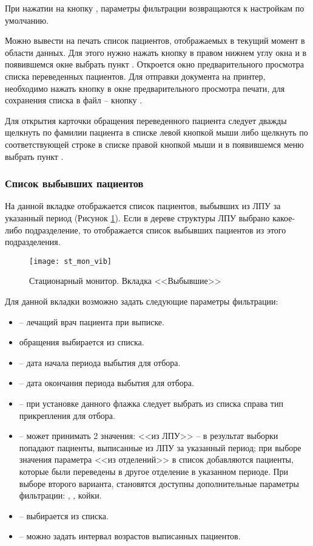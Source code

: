 При нажатии на кнопку , параметры фильтрации возвращаются к настройкам по умолчанию.

Можно вывести на печать список пациентов, отображаемых в текущий момент в области данных. Для этого нужно нажать кнопку   в правом нижнем углу окна и в появившемся окне выбрать пункт . Откроется окно предварительного просмотра списка переведенных пациентов. Для отправки документа на принтер, необходимо нажать кнопку   в окне предварительного просмотра печати, для сохранения списка в файл – кнопку .

Для открытия карточки обращения переведенного пациента следует дважды щелкнуть по фамилии пациента в списке левой кнопкой мыши либо щелкнуть по соответствующей строке в списке правой кнопкой мыши и в появившемся меню выбрать пункт .

\subsubsection{Список выбывших пациентов}

На данной вкладке отображается список пациентов, выбывших из ЛПУ за указанный период (Рисунок \ref{img_st_mon_vib}). Если в дереве структуры ЛПУ выбрано какое-либо подразделение, то отображается список выбывших пациентов из этого подразделения.

\begin{figure}[ht]\centering
   \texttt{[image: st\_mon\_vib]}
   \caption{Стационарный монитор. Вкладка <<Выбывшие>>}
   \label{img_st_mon_vib}
\end{figure}

Для данной вкладки возможно задать следующие параметры фильтрации:
\begin{itemize}
 \item {} – лечащий врач пациента при выписке.
 \item {} обращения выбирается из списка.
 \item {} – дата начала периода выбытия для отбора.
 \item {} – дата окончания периода выбытия для отбора.
 \item {} – при установке данного флажка следует выбрать из списка справа тип прикрепления для отбора.
 \item {} – может принимать 2 значения: <<из ЛПУ>> – в результат выборки попадают пациенты, выписанные из ЛПУ за указанный период; при выборе значения параметра <<из отделений>> в список добавляются пациенты, которые были переведены в другое отделение в указанном периоде. При выборе второго варианта, становятся доступны дополнительные параметры фильтрации: , ,  койки.
 \item {} – выбирается из списка.
 \item {} – можно задать интервал возрастов выписанных пациентов.
\end{itemize}
 
